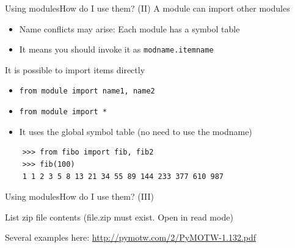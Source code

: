 \documentclass[10pt,compress]{beamer} %
\begin{document}
\begin{frame}[fragile]{Using modules}{How do I use them?  (II)}
	A module can import other modules
		\begin{itemize}
		\item Name conflicts may arise: Each module has a symbol table
		\item It means you should invoke it as \texttt{modname.itemname}
		\end{itemize}
 	It is possible to import items directly
		\begin{itemize}
		\item \texttt{from module import name1, name2}
		\item \texttt{from module import *}
		\item It uses the global symbol table (no need to use the modname)
			\end{itemize}
	
	\begin{block}{}
	\begin{verbatim}
	>>> from fibo import fib, fib2
	>>> fib(100)
	1 1 2 3 5 8 13 21 34 55 89 144 233 377 610 987
	\end{verbatim}
	\end{block}
\end{frame}

\begin{frame}[fragile]{Using modules}{How do I use them?  (III)}
	\vspace{-0.2cm}
	\begin{block}{List zip file contents (file.zip must exist. Open in read mode)}
	\vspace{-0.2cm}
	
	\vspace{-0.2cm}
	\end{block}
	
	\vspace{-0.2cm}
	\centering \footnotesize{Several examples here: \url{http://pymotw.com/2/PyMOTW-1.132.pdf}}
\end{frame}
\end{document}
